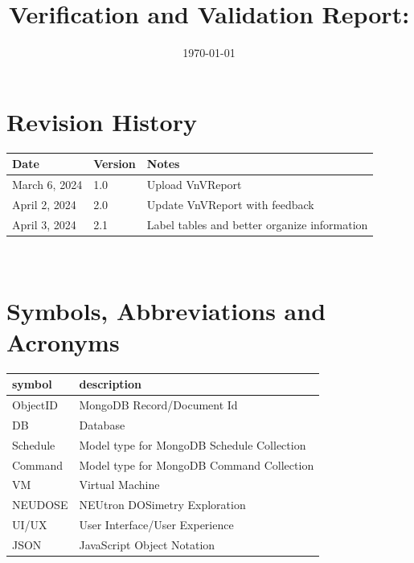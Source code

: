 \documentclass[12pt, titlepage]{article}
\begin{document}
\title{Verification and Validation Report: \progname} 
\author{\authname}
\date{\today}
	
\maketitle


\section{Revision History}

\begin{tabularx}{\textwidth}{p{3cm}p{2cm}X}
\toprule {\bf Date} & {\bf Version} & {\bf Notes}\\
\midrule
March 6, 2024 & 1.0 & Upload VnVReport\\
April 2, 2024 & 2.0 & Update VnVReport with feedback\\
April 3, 2024 & 2.1 & Label tables and better organize information\\
\bottomrule
\end{tabularx}

~\newpage

\section{Symbols, Abbreviations and Acronyms}

\renewcommand{\arraystretch}{1.2}
\begin{tabular}{l l} 
  \toprule		
  \textbf{symbol} & \textbf{description}\\
  \midrule 
  ObjectID & MongoDB Record/Document Id\\
  DB & Database\\
  Schedule & Model type for MongoDB Schedule Collection \\
  Command & Model type for MongoDB Command Collection \\
  VM & Virtual Machine \\
  NEUDOSE & NEUtron DOSimetry Exploration \\
  UI/UX & User Interface/User Experience \\
  JSON & JavaScript Object Notation \\
  \bottomrule
\end{tabular}\\

\newpage

\tableofcontents
\end{document}
